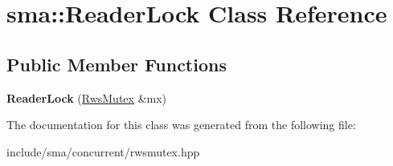 \hypertarget{classsma_1_1ReaderLock}{\section{sma\-:\-:Reader\-Lock Class Reference}
\label{classsma_1_1ReaderLock}
}
\subsection*{Public Member Functions}
\begin{DoxyCompactItemize}
\item 
\hypertarget{classsma_1_1ReaderLock_a94c5e9aa4ea53a5761d62e6537a80f1c}{{\bfseries Reader\-Lock} (\hyperlink{structsma_1_1RwsMutex}{Rws\-Mutex} \&mx)}\label{classsma_1_1ReaderLock_a94c5e9aa4ea53a5761d62e6537a80f1c}

\end{DoxyCompactItemize}


The documentation for this class was generated from the following file\-:\begin{DoxyCompactItemize}
\item 
include/sma/concurrent/rwsmutex.\-hpp\end{DoxyCompactItemize}
